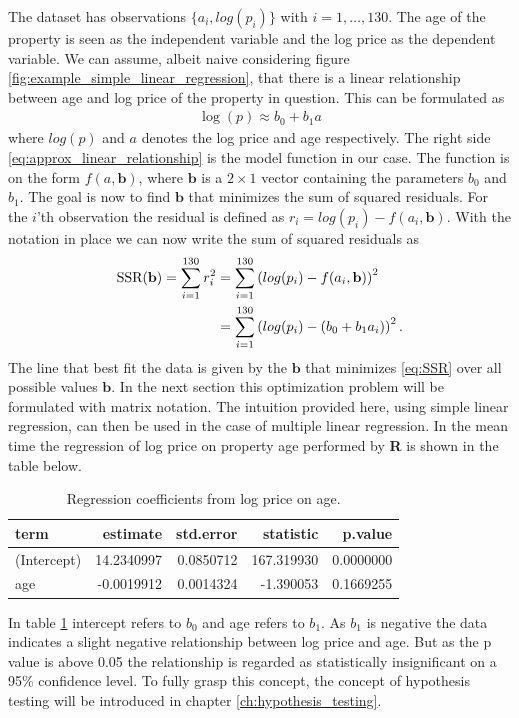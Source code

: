 The dataset has observations $\{a_i, log(p_i)\}$ with $i = 1, \ldots, 130$. 
The age of the property is seen as the independent variable and the log price as the dependent variable.
We can assume, albeit naive considering figure \ref{fig:example_simple_linear_regression}, that there is a linear relationship between age and log price of the property in question.
This can be formulated as
\begin{align}\label{eq:approx_linear_relationship}
    \log(p) \approx b_0 + b_1 a
\end{align}
where $log(p)$ and $a$ denotes the log price and age respectively.
The right side \eqref{eq:approx_linear_relationship} is the model function in our case.
The function is on the form $f(a, \textbf{b})$, where $\textbf{b}$ is a $2 \times 1$ vector containing the parameters $b_0$ and $b_1$.
The goal is now to find $\textbf{b}$ that minimizes the sum of squared residuals.
For the $i$'th observation the residual is defined as $r_i = log(p_i) - f(a_i, \textbf{b})$.
With the notation in place we can now write the sum of squared residuals as
\begin{align}
  \operatorname{\text{SSR}}(\textbf{b}) = \sum_{i = 1}^{130} r_i^2 &= \sum_{i = 1}^{130} \left( log(p_i) - f(a_i, \textbf{b}) \right)^2 \nonumber\\
  &= \sum_{i = 1}^{130} \left( log(p_i) - (b_0 + b_1 a_i) \right)^2.\label{eq:SSR}
\end{align}
The line that best fit the data is given by the $\textbf{b}$ that minimizes \eqref{eq:SSR} over all possible values $\textbf{b}$.
In the next section this optimization problem will be formulated with matrix notation.
The intuition provided here, using simple linear regression, can then be used in the case of multiple linear regression.
In the mean time the regression of log price on property age performed by \textbf{R} is shown in the table below.

\begin{table}[H]
\centering
\begin{tabular}{lrrrr}
\toprule
\textbf{term} & \textbf{estimate} & \textbf{std.error} & \textbf{statistic} & \textbf{p.value}\\
\midrule
(Intercept) & 14.2340997 & 0.0850712 & 167.319930 & 0.0000000\\
age & -0.0019912 & 0.0014324 & -1.390053 & 0.1669255\\
\bottomrule
\end{tabular}
\caption{Regression coefficients from log price on age.}
\label{tab:regress_log_price_on_age}
\end{table}
In table \ref{tab:regress_log_price_on_age} intercept refers to $b_0$ and age refers to $b_1$.
As $b_1$ is negative the data indicates a slight negative relationship between log price and age.
But as the p value is above 0.05 the relationship is regarded as statistically insignificant on a 95\% confidence level.
To fully grasp this concept, the concept of hypothesis testing will be introduced in chapter \ref{ch:hypothesis_testing}.

